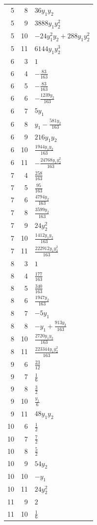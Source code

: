 \documentclass[10pt,a4paper]{article}
\begin{document}
{\begin{longtable}{rrp{125mm}}
5 & 8 & $36 y_{1} y_{2}$\\
5 & 9 & $3888 y_{1} y_{2}^{2}$\\
5 & 10 & $- 24 y_{1}^{2} y_{2} + 288 y_{1} y_{2}^{2}$\\
5 & 11 & $6144 y_{1} y_{2}^{3}$\\
6 & 3 & $1$\\
6 & 4 & $- \frac{83}{163}$\\
6 & 5 & $- \frac{83}{163}$\\
6 & 6 & $- \frac{1239 y_{2}}{163}$\\
6 & 7 & $5 y_{1}$\\
6 & 8 & $y_{1} - \frac{581 y_{2}}{163}$\\
6 & 9 & $216 y_{1} y_{2}$\\
6 & 10 & $\frac{1944 y_{1} y_{2}}{163}$\\
6 & 11 & $- \frac{24768 y_{1} y_{2}^{2}}{163}$\\
7 & 4 & $\frac{258}{163}$\\
7 & 5 & $\frac{95}{163}$\\
7 & 6 & $\frac{4794 y_{2}}{163}$\\
7 & 8 & $\frac{3599 y_{2}}{163}$\\
7 & 9 & $24 y_{2}^{2}$\\
7 & 10 & $\frac{1412 y_{1} y_{2}}{163}$\\
7 & 11 & $\frac{222912 y_{1} y_{2}^{2}}{163}$\\
8 & 3 & $1$\\
8 & 4 & $\frac{177}{163}$\\
8 & 5 & $\frac{340}{163}$\\
8 & 6 & $\frac{1947 y_{2}}{163}$\\
8 & 7 & $- 5 y_{1}$\\
8 & 8 & $- y_{1} + \frac{913 y_{2}}{163}$\\
8 & 10 & $\frac{2720 y_{1} y_{2}}{163}$\\
8 & 11 & $\frac{223344 y_{1} y_{2}^{2}}{163}$\\
9 & 6 & $\frac{23}{12}$\\
9 & 7 & $\frac{1}{6}$\\
9 & 8 & $\frac{3}{2}$\\
9 & 10 & $\frac{y_{1}}{6}$\\
9 & 11 & $48 y_{1} y_{2}$\\
10 & 6 & $\frac{1}{2}$\\
10 & 7 & $\frac{7}{2}$\\
10 & 8 & $\frac{5}{2}$\\
10 & 9 & $54 y_{2}$\\
10 & 10 & $- y_{1}$\\
10 & 11 & $24 y_{2}^{2}$\\
11 & 9 & $2$\\
11 & 10 & $\frac{1}{6}$\\
\end{longtable}}
\end{document}
